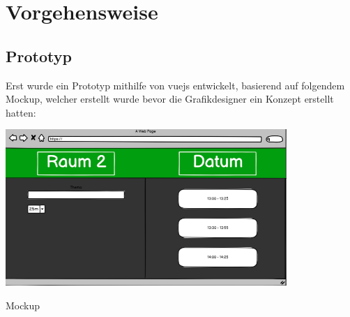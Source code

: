 
\pagebreak
\section{Vorgehensweise}
\subsection{Prototyp}
Erst wurde ein Prototyp mithilfe von vuejs entwickelt, basierend auf folgendem Mockup, welcher erstellt wurde bevor die Grafikdesigner ein Konzept erstellt hatten:
\par\vspace{1cm}
    \centering
    \includegraphics[width=0.8\textwidth]{Bilder/mockup}
    \caption{Mockup}
    \label{fig:Mockup}
\par\vspace{1cm}
\raggedright